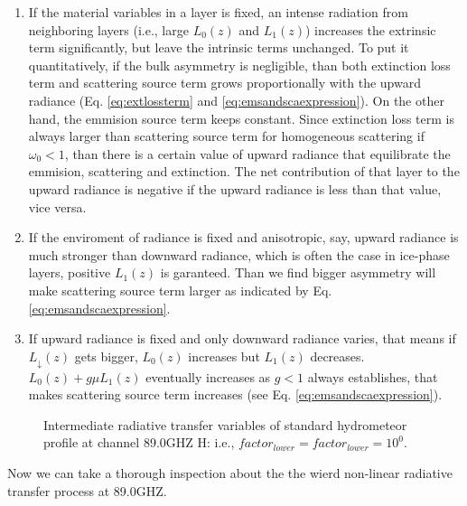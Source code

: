 \begin{enumerate}
    \item {} If the material variables in a layer is fixed, an intense radiation from neighboring layers (i.e., large $L_{0}(z)$ and $L_{1}(z)$)
increases the extrinsic term significantly, but leave the intrinsic terms unchanged. To put it quantitatively, if the bulk asymmetry is negligible,
than both extinction loss term and scattering source term grows proportionally with the upward radiance (Eq. \ref{eq:extlossterm} and \ref{eq:emsandscaexpression}).
On the other hand, the emmision source term keeps constant. Since extinction loss term is always larger than scattering source term for homogeneous scattering if $\omega_{0} < 1$,
than there is a certain value of upward radiance that equilibrate the emmision, scattering and extinction. The net contribution of that layer to the upward radiance
is negative if the upward radiance is less than that value, vice versa.  
    \item {} If the enviroment of radiance is fixed and anisotropic, say, upward radiance is much stronger than downward radiance,
    which is often the case in ice-phase layers, positive $L_{1}(z)$ is garanteed. Than we find bigger asymmetry will make 
    scattering source term larger as indicated by Eq. \ref{eq:emsandscaexpression}.
    \item {} If upward radiance is fixed and only downward radiance varies, that means if $L_{\downarrow}(z)$ gets bigger, $L_{0}(z)$
    increases but $L_{1}(z)$ decreases. $L_{0}(z) + g\mu L_{1}(z)$ eventually increases as $g < 1$ always establishes, that makes scattering
    source term increases (see Eq. \ref{eq:emsandscaexpression}).  
\end{enumerate}

\begin{figure}[hbtp] 
\centering
{}
\caption{Intermediate radiative transfer variables of standard hydrometeor profile at channel 89.0GHZ H: 
i.e., $factor_{lower} = factor_{lower} = 10^{0}$.}
\label{fig:MWRI5zi33}
\end{figure}

Now we can take a thorough inspection about the the wierd non-linear radiative transfer process at 89.0GHZ.

